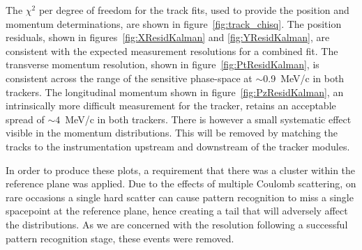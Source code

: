   The $\chi^2$ per degree of freedom for the track fits, used to provide the position and momentum determinations, are shown in figure~\ref{fig:track_chisq}. 
  The position residuals, shown in figures~\ref{fig:XResidKalman} and \ref{fig:YResidKalman}, are consistent with the expected measurement resolutions for a combined fit. The transverse momentum resolution, shown in figure~\ref{fig:PtResidKalman}, is consistent across the range of the sensitive phase-space at $\sim$0.9~MeV/c in both trackers. The longitudinal momentum shown in figure~\ref{fig:PzResidKalman}, an intrinsically more difficult measurement for the tracker, retains an acceptable spread of ${\sim4}$~MeV/c in both trackers. There is however a small systematic effect visible in the momentum distributions. This will be removed by matching the tracks to the instrumentation upstream and downstream of the tracker modules.

  In order to produce these plots, a requirement that there was a cluster within the reference plane was applied. Due to the effects of multiple Coulomb scattering, on rare occasions a single hard scatter can cause pattern recognition to miss a single spacepoint at the reference plane, hence creating a tail that will adversely affect the distributions. As we are concerned with the resolution following a successful pattern recognition stage, these events were removed.
  
 
  
